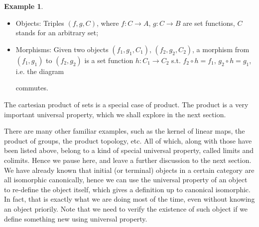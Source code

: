 \documentclass{article}
\theoremstyle{definition}
\theoremstyle{definition}
\newtheorem{example}{Example}[section]
\theoremstyle{remark}
\begin{document}
\begin{example}
\begin{enumerate}[label=(\roman*)]
			\begin{itemize}
				\item Objects: Triples $(f,g,C)$, where $f:C\to A$, $g:C\to B$ are set functions, $C$ stands for an arbitrary set;
				\item Morphisms: Given two objects $(f_1,g_1,C_1)$, $(f_2,g_2,C_2)$, a morphism from $(f_1,g_1)$ to $(f_2,g_2)$ is a set function $h:C_1\to C_2$ s.t. $f_2\circ h=f_1$, $g_2\circ h=g_1$, i.e. the diagram
				commutes.
			\end{itemize}
	The cartesian product of sets is a special case of product. The product is a very important universal property, which we shall explore in the next section.
	\end{enumerate}
\end{example}
There are many other familiar examples, such as the kernel of linear maps, the product of groups, the product topology, etc. All of which, along with those have been listed above, belong to a kind of special universal property, called limits and colimits. Hence we pause here, and leave a further discussion to the next section. We have already known that initial (or terminal) objects in a certain category are all isomorphic canonically, hence we can use the universal property of an object to re-define the object itself, which gives a definition up to canonical isomorphic. In fact, that is exactly what we are doing most of the time, even without knowing an object priorily. Note that we need to verify the existence of such object if we define something new using universal property. 
\end{document}
